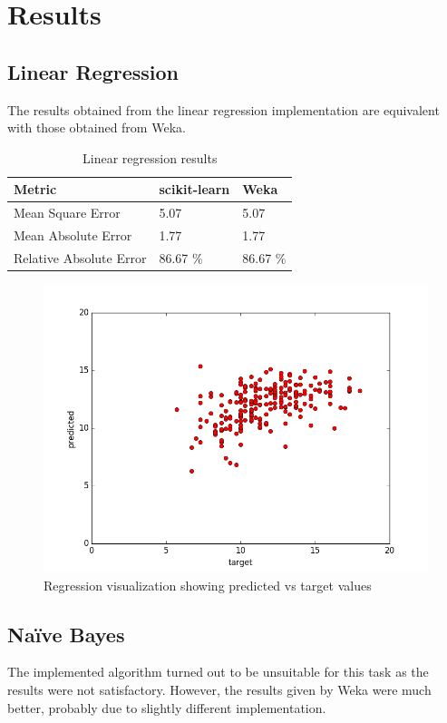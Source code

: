 \section{Results}
\subsection{Linear Regression}
The results obtained from the linear regression implementation are equivalent with those obtained from Weka.

\begin{table}[h!]
  \centering
  \begin{tabular}{lll}
  \hline
  \textbf{Metric} & \textbf{scikit-learn} & \textbf{Weka} \\
  \hline
  Mean Square Error & 5.07 & 5.07 \\
  Mean Absolute Error & 1.77 & 1.77\\
  Relative Absolute Error & 86.67 \% & 86.67 \%\\
  \hline
  \end{tabular}
  \caption{Linear regression results}
  \label{tab:table3}
\end{table}

\begin{figure}[h!]
    \centering
    \includegraphics[width = 0.9\linewidth]{l_regression_test.png}
    \caption{Regression visualization showing predicted vs target values}
    \label{fig:fig1}
\end{figure}

\subsection{Naïve Bayes}
The implemented algorithm turned out to be unsuitable for this task as the results were not satisfactory. However, the results given by Weka were much better, probably due to slightly different implementation.

